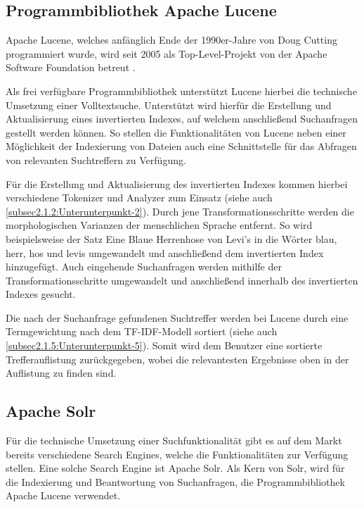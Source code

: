 \subsection{Programmbibliothek \glqq Apache Lucene\grqq{}\label{subsec4.2.2:Unterunterpunkt-2}}

Apache Lucene, welches anfänglich Ende der 1990er-Jahre von Doug Cutting programmiert wurde, wird seit 2005 als Top-Level-Projekt von der Apache Software Foundation betreut \cite{StefanLuber.2018}.

Als frei verfügbare Programmbibliothek unterstützt Lucene hierbei die technische Umsetzung einer Volltextsuche. Unterstützt wird hierfür die Erstellung und Aktualisierung eines invertierten Indexes, auf welchem anschließend Suchanfragen gestellt werden können. So stellen die Funktionalitäten von Lucene neben einer Möglichkeit der Indexierung von Dateien auch eine Schnittstelle für das Abfragen von relevanten Suchtreffern zu Verfügung.

Für die Erstellung und Aktualisierung des invertierten Indexes kommen hierbei verschiedene Tokenizer und Analyzer zum Einsatz (siehe auch \autoref{subsec2.1.2:Unterunterpunkt-2}). Durch jene Transformationsschritte werden die morphologischen Varianzen der menschlichen Sprache entfernt. So wird beispielsweise der Satz \glqq Eine Blaue Herrenhose von Levi's\textregistered\grqq{} in die Wörter \glqq blau\grqq{}, \glqq herr\grqq{}, \glqq hos\grqq{} und \glqq levis\grqq{} umgewandelt und anschließend dem invertierten Index hinzugefügt. Auch eingehende Suchanfragen werden mithilfe der Transformationsschritte umgewandelt und anschließend innerhalb des invertierten Indexes gesucht.

Die nach der Suchanfrage gefundenen Suchtreffer werden bei Lucene durch eine Termgewichtung nach dem \glqq TF-IDF\grqq{}-Modell sortiert (siehe auch \autoref{subsec2.1.5:Unterunterpunkt-5}). Somit wird dem Benutzer eine sortierte Trefferauflistung zurückgegeben, wobei die relevantesten Ergebnisse oben in der Auflistung zu finden sind.

\subsection{Apache Solr\label{subsec4.2.3:Unterunterpunkt-3}}

Für die technische Umsetzung einer Suchfunktionalität gibt es auf dem Markt bereits verschiedene Search Engines, welche die Funktionalitäten zur Verfügung stellen. Eine solche Search Engine ist \glqq Apache Solr\grqq{}. Als Kern von Solr, wird für die Indexierung und Beantwortung von Suchanfragen, die Programmbibliothek \glqq Apache Lucene\grqq{} verwendet.

